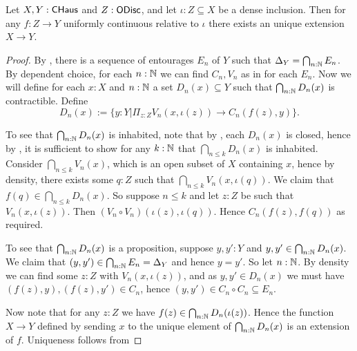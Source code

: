 \begin{theorem}\label{ExtensionCHaus}
  Let $X,Y:\mathsf{CHaus}$ and $Z:\mathsf{ODisc}$, and let $\iota:Z\subseteq X$ be a dense inclusion. Then for any $f:Z\to Y$ uniformly continuous relative to $\iota$ there exists an unique extension $X \to Y$. 
\end{theorem} 
\begin{proof}
  By , there is a sequence of entourages $E_n$ of $Y$ such that $\Delta_Y = \bigcap_{n:\mathbb{N}} E_n$. By dependent choice, for each $n:\mathbb{N}$ we can find $C_n,V_n$ as in  for each $E_n$. 
  Now we will define for each $x:X$ and $n:\mathbb{N}$ a set $D_n(x)\subseteq Y$ such that $\bigcap_{n:\mathbb{N}} D_n(x)$ is contractible. Define
  $$D_n(x):=  \{y:Y | \Pi_{z:Z} V_n(x,\iota(z)) \to C_n(f(z),y)\}. $$
  \item To see that $\bigcap_{n:\mathbb{N}}D_n(x)$ is inhabited, note that by , each $D_n(x)$ is closed, hence by , it is sufficient to show for any $k:\mathbb{N}$ that $\bigcap_{n\leq k}D_n(x)$ is inhabited. 
    Consider $\bigcap_{n\leq k}V_n(x)$, which is an open subset of $X$ containing $x$, hence by density, there exists some $q:Z$ such that $\bigcap_{n\leq k}V_n(x,\iota(q))$. We claim that $f(q)\in \bigcap_{n\leq k}D_n(x)$. So suppose $n\leq k$ and let $z:Z$ be such that $V_n(x,\iota(z))$. Then $(V_n\circ V_n)(\iota(z),\iota(q))$. Hence $C_n(f(z),f(q))$ as required. 
  \item To see that $\bigcap_{n:\mathbb{N}} D_n(x)$ is a proposition, suppose $y,y':Y$ and $y,y' \in \bigcap_{n:\mathbb{N}} D_n(x)$. We claim that $(y,y') \in \bigcap_{n:\mathbb{N}} E_n = \Delta_Y$ and hence $y = y'$. So let $n:\mathbb{N}$. By density we can find some $z:Z$ with $V_n(x,\iota(z))$, and as $y,y'\in D_n(x)$ we must have $(f(z),y),(f(z),y') \in C_n$, hence $(y,y') \in C_n \circ C_n \subseteq E_n$. 
  \item Now note that for any $z:Z$ we have $f(z) \in \bigcap_{n:\mathbb{N}} D_n(\iota(z))$. Hence the function $X \to Y$ defined by sending $x$ to the unique element of $\bigcap_{n:\mathbb{N}}D_n(x)$ is an extension of $f$. Uniqueness follows from 

\end{proof}
%

